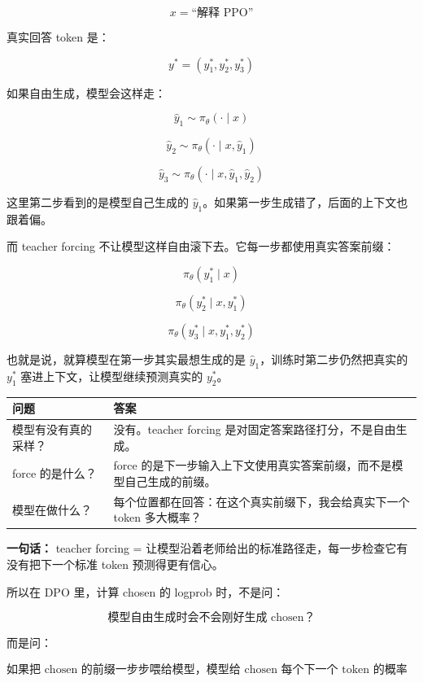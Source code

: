 \[
x = \text{``解释 PPO''}
\]

真实回答 token 是：

\[
y^\ast = (y_1^\ast, y_2^\ast, y_3^\ast)
\]

如果自由生成，模型会这样走：

\[
\hat{y}_1 \sim \pi_\theta(\cdot \mid x)
\]

\[
\hat{y}_2 \sim \pi_\theta(\cdot \mid x, \hat{y}_1)
\]

\[
\hat{y}_3 \sim \pi_\theta(\cdot \mid x, \hat{y}_1, \hat{y}_2)
\]

这里第二步看到的是模型自己生成的 $\hat{y}_1$。如果第一步生成错了，后面的上下文也跟着偏。

而 teacher forcing 不让模型这样自由滚下去。它每一步都使用真实答案前缀：

\[
\pi_\theta(y_1^\ast \mid x)
\]

\[
\pi_\theta(y_2^\ast \mid x, y_1^\ast)
\]

\[
\pi_\theta(y_3^\ast \mid x, y_1^\ast, y_2^\ast)
\]

也就是说，就算模型在第一步其实最想生成的是 $\hat{y}_1$，训练时第二步仍然把真实的 $y_1^\ast$ 塞进上下文，让模型继续预测真实的 $y_2^\ast$。

\begin{center}
{\small
\begin{tabular}{p{3.2cm}p{9.6cm}}
\hline
\textbf{问题} & \textbf{答案} \\
\hline
模型有没有真的采样？
&
没有。teacher forcing 是对固定答案路径打分，不是自由生成。
\\
force 的是什么？
&
force 的是下一步输入上下文使用真实答案前缀，而不是模型自己生成的前缀。
\\
模型在做什么？
&
每个位置都在回答：在这个真实前缀下，我会给真实下一个 token 多大概率？
\\
\hline
\end{tabular}
}
\end{center}

\begin{intubox}
\textbf{一句话：} teacher forcing = 让模型沿着老师给出的标准路径走，每一步检查它有没有把下一个标准 token 预测得更有信心。
\end{intubox}

所以在 DPO 里，计算 chosen 的 logprob 时，不是问：

\[
\text{模型自由生成时会不会刚好生成 chosen？}
\]

而是问：

\[
\text{如果把 chosen 的前缀一步步喂给模型，模型给 chosen 每个下一个 token 的概率有多高？}
\]

